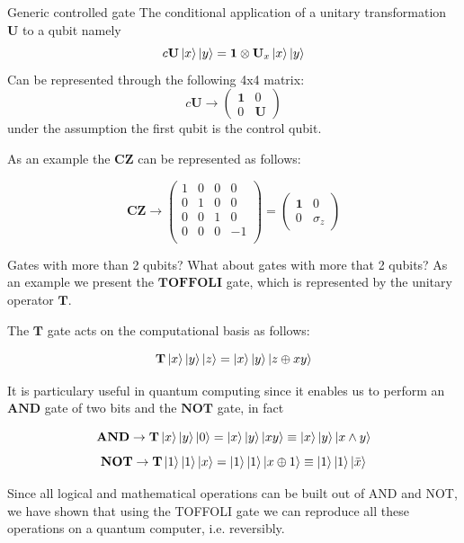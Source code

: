 \documentclass[11p,aspectratio=169]{beamer}
\begin{document}
\begin{frame}{Generic controlled gate}
    The conditional application of a unitary transformation $\textbf{U}$ to a qubit namely 
    $$ c\textbf{U} \ket{x} \ket{y} = \mathbf{1} \otimes \textbf{U}_x \ket{x} \ket{y}$$
    Can be represented through the following 4x4 matrix:
    $$ c\textbf{U} \rightarrow \begin{pmatrix}
        \textbf{1} & 0 \\
        0 & \textbf{U}
    \end{pmatrix}$$
    under the assumption the first qubit is the control qubit.

    As an example the $\textbf{CZ}$ can be represented as follows:

    $$ \textbf{CZ} \rightarrow \begin{pmatrix}
        1 & 0 & 0 & 0 \\
        0 & 1 & 0 & 0 \\
        0 & 0 & 1 & 0 \\
        0 & 0 & 0 & -1 \\
    \end{pmatrix} = 
    \begin{pmatrix}
        \textbf{1} & 0 \\
        0 &  \sigma_z
    \end{pmatrix}
        $$    
\end{frame}

\begin{frame}{Gates with more than 2 qubits?}
    What about gates with more that 2 qubits?
    As an example we present the $\textbf{TOFFOLI}$ gate, which is represented by the unitary operator $\textbf{T}$.

    The $\textbf{T}$ gate acts on the computational basis as follows:

    $$ \textbf{T} \ket{x} \ket{y} \ket{z} = \ket{x} \ket{y} \ket{z \oplus xy}$$

    It is particulary useful in quantum computing since it enables us to perform an $\textbf{AND}$ gate of two bits
    and the $\textbf{NOT}$ gate, in fact

    $$ \textbf{AND} \rightarrow \textbf{T} \ket{x} \ket{y} \ket{0} =  \ket{x} \ket{y} \ket{xy} \equiv \ket{x} \ket{y} \ket{x \wedge y}$$
    $$  \textbf{NOT} \rightarrow \textbf{T} \ket{1} \ket{1} \ket{x} =  \ket{1} \ket{1} \ket{x \oplus 1} \equiv \ket{1} \ket{1} \ket{\bar{x}}$$

    Since all logical and mathematical operations can be built out of AND and NOT, we have shown that using the TOFFOLI gate
    we can reproduce all these operations on a quantum computer, i.e. reversibly.
\end{frame}
\end{document}
